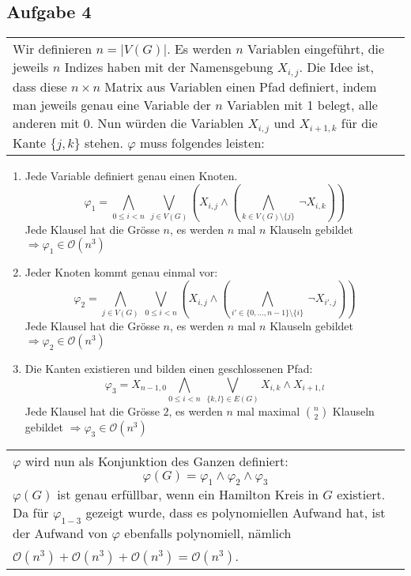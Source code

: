 \documentclass[a4paper,10pt]{article}
\newcommand{\tabspace}{15cm}
\begin{document}
\subsection*{Aufgabe 4}
\begin{tabular}{@{} p{\tabspace}}
Wir definieren $n = |V(G)|$. Es werden $n$ Variablen eingeführt, die jeweils $n$ Indizes haben mit der Namensgebung $X_{i,j}$. Die Idee ist, dass diese $n \times n$ Matrix aus Variablen einen Pfad definiert, indem man jeweils genau eine Variable der $n$ Variablen mit 1 belegt, alle anderen mit 0. Nun würden die Variablen $X_{i,j}$ und $X_{i+1,k}$ für die Kante $\{j,k\}$ stehen. $\varphi$ muss folgendes leisten:
\end{tabular}
\begin{enumerate}
	\item 	Jede Variable definiert genau einen Knoten.
		\[\varphi_1 = \bigwedge_{0 \le i < n } ~\bigvee_{j \in {V(G)}} \left( X_{i,j} \land \left( \bigwedge_{k \in V(G)\setminus\{ j\}} ~ \lnot X_{i,k} \right) \right) \]
		Jede Klausel hat die Grösse $n$, es werden $n$ mal $n$ Klauseln gebildet $\Rightarrow \varphi_1 \in \mathcal{O}(n^3)$
	\item 	Jeder Knoten kommt genau einmal vor:
		\[\varphi_2 = \bigwedge_{j \in {V(G)}} ~\bigvee_{0 \le i < n } \left( X_{i,j} \land \left( \bigwedge_{i' \in \{0,...,n-1 \}\setminus\{ i\}} ~ \lnot X_{i',j} \right) \right)\]
		Jede Klausel hat die Grösse $n$, es werden $n$ mal $n$ Klauseln gebildet $\Rightarrow \varphi_2 \in \mathcal{O}(n^3)$
	\item  	Die Kanten existieren und bilden einen geschlossenen Pfad:
		\[\varphi_3 = X_{n-1,0}\bigwedge_{0 \le i <n}~ \bigvee_{\{k,l\} \in E(G)} X_{i,k} \land X_{i+1,l}  \]
		Jede Klausel hat die Grösse $2$, es werden $n$ mal maximal $\binom{n}{2}$ Klauseln gebildet $\Rightarrow \varphi_3 \in \mathcal{O}(n^3)$
\end{enumerate}
\begin{tabular}{@{} p{\tabspace}}
$\varphi$ wird nun als Konjunktion des Ganzen definiert: \[\varphi(G) = \varphi_1 \land \varphi_2 \land \varphi_3 \] 
$\varphi(G)$ ist genau erfüllbar, wenn ein Hamilton Kreis in $G$ existiert. Da für $\varphi_{1-3}$ gezeigt wurde, dass es polynomiellen Aufwand hat, ist der Aufwand von $\varphi$ ebenfalls polynomiell, nämlich\\
$\mathcal{O}(n^3) + \mathcal{O}(n^3) + \mathcal{O}(n^3) = \mathcal{O}(n^3)$.

\end{tabular}
\end{document}

